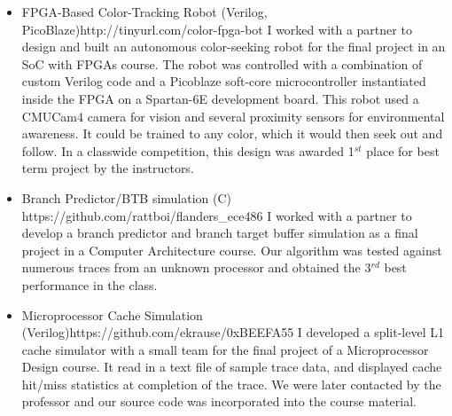 \documentclass{article}
\begin{document}
	\vspace{-15pt}
	
	\begin{itemize}
		\item \NameUrlTextBlock
		{FPGA-Based Color-Tracking Robot (Verilog, PicoBlaze)}{http://tinyurl.com/color-fpga-bot}
		{I worked with a partner to design and built an autonomous color-seeking robot for the final project in an SoC with FPGAs course.  The robot was controlled with a combination of custom Verilog code and a Picoblaze soft-core microcontroller instantiated inside the FPGA on a Spartan-6E development board.  This robot used a CMUCam4 camera for vision and several proximity sensors for environmental awareness.  It could be trained to any color, which it would then seek out and follow. 
In a classwide competition, this design was awarded 1$^{st}$ place for best term project by the instructors.}
 
		\item \NameUrlTextBlock
		{Branch Predictor/BTB simulation (C)}	{https://github.com/rattboi/flanders_ece486}
		{I worked with a partner to develop a branch predictor and branch target buffer simulation as a final project in a Computer Architecture course.   Our algorithm was tested against numerous traces from an unknown processor and obtained the 3$^{rd}$ best performance in the class.}
		
		\item \NameUrlTextBlock
		{Microprocessor Cache Simulation (Verilog)}{https://github.com/ekrause/0xBEEFA55}
		{I developed a split-level L1 cache simulator with a small team for the final project of a Microprocessor Design course. It read in a text file of sample trace data, and displayed cache hit/miss statistics at completion of the trace.  We were later contacted by the professor and our source code was incorporated into the course material.}
	\end{itemize}
	\vspace{-4pt}
\end{document}
